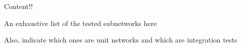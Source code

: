 Content!!

An exhaustive list of the tested subnetworks here

Also, indicate which ones are unit networks and which are integration tests
